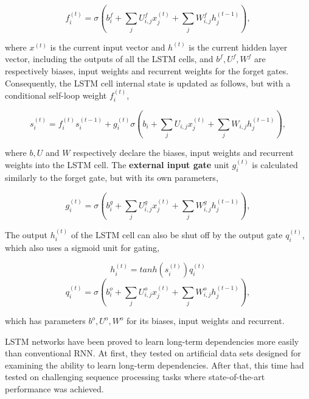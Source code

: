 \begin{equation}
    f^{(t)}_i = \sigma (b^f_i + \sum_j U^f_{i,j} x^{(t)}_j + \sum_j W^f_{i,j} h^{(t-1)}_j) ,\label{eq:equation22}
\end{equation}

where $x^{(t)}$ is the current input vector and $h^{(t)}$ is the current hidden layer vector,
including the outputs of all the LSTM cells, and $b^f ,U^f , W^f$ are respectively
biases, input weights and recurrent weights for the forget gates.
Consequently, the LSTM cell internal state is updated as follows, but with a conditional self-loop weight $f^{(t)}_i$,

\begin{equation}
    s^{(t)}_i = f^{(t)}_i s^{(t-1)}_i + g^{(t)}_i \sigma (b_i + \sum_j U_{i,j} x^{(t)}_j + \sum_j W_{i,j} h^{(t-1)}_j) ,\label{eq:equation23}
\end{equation}

where $b, U$ and $W$ respectively declare the biases, input weights and recurrent weights into the LSTM cell.
The \textbf{external input gate} unit $g^{(t)}_i$ is calculated similarly to the forget gate, but with its own parameters,

\begin{equation}
    g^{(t)}_i = \sigma (b^g_i + \sum_j U^g_{i,j} x^{(t)}_j + \sum_j W^g_{i,j} h^{(t-1)}_j) ,\label{eq:equation24}
\end{equation}

The output $h^{(t)}_i$ of the LSTM cell can also be shut off by the output gate $q^{(t)}_i$, which also uses a sigmoid unit for gating,

\begin{equation}
    h^{(t)}_i = tanh(s^{(t)}_i) q^{(t)}_i\label{eq:equation25}
\end{equation}
\begin{equation}
    q^{(t)}_i = \sigma (b^o_i + \sum_j U^o_{i,j} x^{(t)}_j + \sum_j W^o_{i,j} h^{(t-1)}_j) ,\label{eq:equation26}
\end{equation}

which has parameters $b^o, U^o, W^o$ for its biases, input weights and recurrent.

LSTM networks have been proved to learn long-term dependencies more easily than conventional RNN\@.
At first, they tested on artificial data sets designed for examining the ability to learn long-term dependencies.
After that, this time had tested on challenging sequence processing tasks where state-of-the-art performance was achieved.


